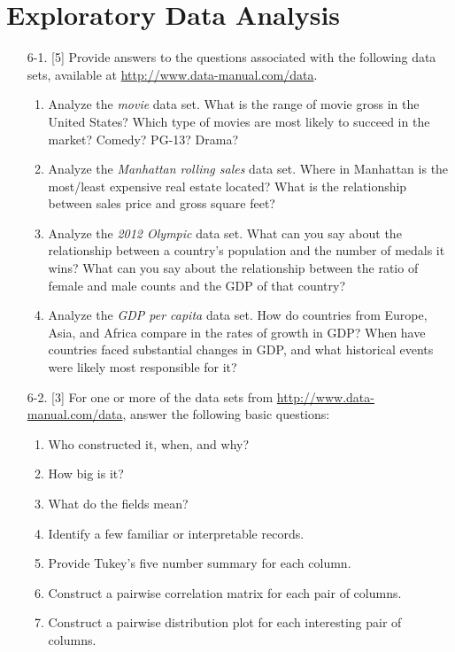 \documentclass[10pt]{article}
\begin{document}
\section{Exploratory Data Analysis}
\begin{enumerate}
  \item[6-1.] [5] Provide answers to the questions associated with the following data sets, available at \url{http://www.data-manual.com/data}.
    \begin{enumerate}[label=(\alph*)]
      \item Analyze the \textit{movie} data set. What is the range of movie gross in the United States? Which type of movies are most likely to succeed in the market? Comedy? PG-13? Drama?
      \item Analyze the \textit{Manhattan rolling sales} data set. Where in Manhattan is the most/least expensive real estate located? What is the relationship between sales price and gross square feet?
      \item Analyze the \textit{2012 Olympic} data set. What can you say about the relationship between a country's population and the number of medals it wins? What can you say about the relationship between the ratio of female and male counts and the GDP of that country?
      \item Analyze the \textit{GDP per capita} data set. How do countries from Europe, Asia, and Africa compare in the rates of growth in GDP? When have countries faced substantial changes in GDP, and what historical events were likely most responsible for it?
    \end{enumerate}
  \item[6-2.] [3] For one or more of the data sets from \url{http://www.data-manual.com/data}, answer the following basic questions:
    \begin{enumerate}[label=(\alph*)]
      \item Who constructed it, when, and why?
      \item How big is it?
      \item What do the fields mean?
      \item Identify a few familiar or interpretable records.
      \item Provide Tukey's five number summary for each column.
      \item Construct a pairwise correlation matrix for each pair of columns.
      \item Construct a pairwise distribution plot for each interesting pair of columns.
    \end{enumerate}
\end{enumerate}
\end{document}
